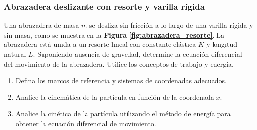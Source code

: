\subsubsection{Abrazadera deslizante con resorte y varilla rígida}

Una abrazadera de masa $m$ se desliza sin fricción a lo largo de una varilla rígida y sin masa, como se muestra en la \textbf{Figura \ref{fig:abrazadera_resorte}}. La abrazadera está unida a un resorte lineal con constante elástica $K$ y longitud natural $L$. Suponiendo ausencia de gravedad, determine la ecuación diferencial del movimiento de la abrazadera. Utilice los conceptos de trabajo y energía.

\begin{enumerate}
    \item Defina los marcos de referencia y sistemas de coordenadas adecuados.
    \item Analice la cinemática de la partícula en función de la coordenada $x$.
    \item Analice la cinética de la partícula utilizando el método de energía para obtener la ecuación diferencial de movimiento.
\end{enumerate}

